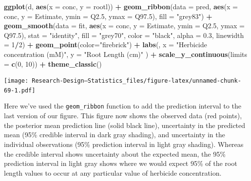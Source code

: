 \documentclass[
]{book}
\newenvironment{Shaded}{\begin{snugshade}}{\end{snugshade}}
\newcommand{\AttributeTok}[1]{\textcolor[rgb]{0.13,0.29,0.53}{#1}}
\newcommand{\DecValTok}[1]{\textcolor[rgb]{0.00,0.00,0.81}{#1}}
\newcommand{\FloatTok}[1]{\textcolor[rgb]{0.00,0.00,0.81}{#1}}
\newcommand{\FunctionTok}[1]{\textcolor[rgb]{0.13,0.29,0.53}{\textbf{#1}}}
\newcommand{\NormalTok}[1]{#1}
\newcommand{\SpecialCharTok}[1]{\textcolor[rgb]{0.81,0.36,0.00}{\textbf{#1}}}
\newcommand{\StringTok}[1]{\textcolor[rgb]{0.31,0.60,0.02}{#1}}
\begin{document}
\begin{Shaded}
\begin{Highlighting}[]
\FunctionTok{ggplot}\NormalTok{(d, }\FunctionTok{aes}\NormalTok{(}\AttributeTok{x =}\NormalTok{ conc, }\AttributeTok{y =}\NormalTok{ rootl)) }\SpecialCharTok{+}
  \FunctionTok{geom\_ribbon}\NormalTok{(}\AttributeTok{data =}\NormalTok{ pred, }
              \FunctionTok{aes}\NormalTok{(}\AttributeTok{x =}\NormalTok{ conc, }\AttributeTok{y =}\NormalTok{ Estimate, }\AttributeTok{ymin =}\NormalTok{ Q2}\FloatTok{.5}\NormalTok{, }\AttributeTok{ymax =}\NormalTok{ Q97}\FloatTok{.5}\NormalTok{),}
              \AttributeTok{fill =} \StringTok{"grey83"}\NormalTok{) }\SpecialCharTok{+}
  \FunctionTok{geom\_smooth}\NormalTok{(}\AttributeTok{data =}\NormalTok{ fit,}
              \FunctionTok{aes}\NormalTok{(}\AttributeTok{x =}\NormalTok{ conc, }\AttributeTok{y =}\NormalTok{ Estimate, }\AttributeTok{ymin =}\NormalTok{ Q2}\FloatTok{.5}\NormalTok{, }\AttributeTok{ymax =}\NormalTok{ Q97}\FloatTok{.5}\NormalTok{),}
              \AttributeTok{stat =} \StringTok{"identity"}\NormalTok{,}
              \AttributeTok{fill =} \StringTok{"grey70"}\NormalTok{, }\AttributeTok{color =} \StringTok{"black"}\NormalTok{, }\AttributeTok{alpha =} \FloatTok{0.3}\NormalTok{, }\AttributeTok{linewidth =} \DecValTok{1}\SpecialCharTok{/}\DecValTok{2}\NormalTok{) }\SpecialCharTok{+}
  \FunctionTok{geom\_point}\NormalTok{(}\AttributeTok{color=}\StringTok{"firebrick"}\NormalTok{) }\SpecialCharTok{+}
  \FunctionTok{labs}\NormalTok{(,}
    \AttributeTok{x =} \StringTok{"Herbicide concentration (mM)"}\NormalTok{,}
    \AttributeTok{y =} \StringTok{"Root Length (cm)"}
\NormalTok{  ) }\SpecialCharTok{+}
  \FunctionTok{scale\_y\_continuous}\NormalTok{(}\AttributeTok{limits =} \FunctionTok{c}\NormalTok{(}\DecValTok{0}\NormalTok{, }\DecValTok{10}\NormalTok{)) }\SpecialCharTok{+} 
  \FunctionTok{theme\_classic}\NormalTok{()}
\end{Highlighting}
\end{Shaded}

\texttt{[image: Research-Design---Statistics\_files/figure-latex/unnamed-chunk-69-1.pdf]}

Here we've used the \texttt{geom\_ribbon} function to add the prediction interval to the last version of our figure. This figure now shows the observed data (red points), the posterior mean prediction line (solid black line), uncertainty in the predicted mean (95\% credible interval in dark gray shading), and uncertainty in the individual observations (95\% prediction interval in light gray shading). Whereas the credible interval shows uncertainty about the expected mean, the 95\% prediction interval in light gray shows where we would expect 95\% of the root length values to occur at any particular value of herbicide concentration.
\end{document}
